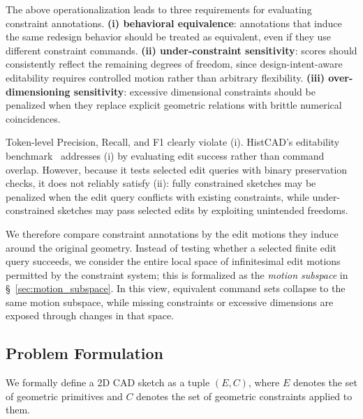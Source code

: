 The above operationalization leads to three requirements for evaluating constraint annotations. \textbf{(i) behavioral equivalence}: annotations that induce the same redesign behavior should be treated as equivalent, even if they use different constraint commands. \textbf{(ii) under-constraint sensitivity}: scores should consistently reflect the remaining degrees of freedom, since design-intent-aware editability requires controlled motion rather than arbitrary flexibility. \textbf{(iii) over-dimensioning sensitivity}: excessive dimensional constraints should be penalized when they replace explicit geometric relations with brittle numerical coincidences.

Token-level Precision, Recall, and F1 clearly violate (i). HistCAD's editability benchmark~\cite{dong2025histcad} addresses (i) by evaluating edit success rather than command overlap. However, because it tests selected edit queries with binary preservation checks, it does not reliably satisfy (ii): fully constrained sketches may be penalized when the edit query conflicts with existing constraints, while under-constrained sketches may pass selected edits by exploiting unintended freedoms.

We therefore compare constraint annotations by the edit motions they induce around the original geometry. Instead of testing whether a selected finite edit query succeeds, we consider the entire local space of infinitesimal edit motions permitted by the constraint system; this is formalized as the \textit{motion subspace} in \S~\ref{sec:motion_subspace}. In this view, equivalent command sets collapse to the same motion subspace, while missing constraints or excessive dimensions are exposed through changes in that space.


\subsection{Problem Formulation}
\label{sec:problem_formulation}

We formally define a 2D CAD sketch as a tuple $(E, C)$, where $E$ denotes the set of geometric primitives and $C$ denotes the set of geometric constraints applied to them.

